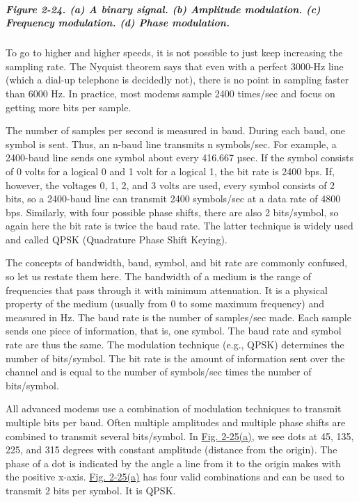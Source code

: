 \subparagraph[Figure 2-24. (a) A binary signal. (b) Amplitude
modulation. (c) Frequency modulation. (d) Phase
modulation.]{\texorpdfstring{\protect\hypertarget{0130661023_ch02lev1sec5.htmlux5cux23ch02fig24}{}{}Figure
2-24. (a) A binary signal. (b) Amplitude modulation. (c) Frequency
modulation. (d) Phase
modulation.}{Figure 2-24. (a) A binary signal. (b) Amplitude modulation. (c) Frequency modulation. (d) Phase modulation.}}


To go to higher and higher speeds, it is not possible to just keep
increasing the sampling rate. The Nyquist theorem says that even with a
perfect 3000-Hz line (which a dial-up telephone is decidedly not), there
is no point in sampling faster than 6000 Hz. In practice, most modems
sample 2400 times/sec and focus on getting more bits per sample.

The number of samples per second is measured in {baud}. During each
baud, one {symbol} is sent. Thus, an {n}-baud line transmits {n}
symbols/sec. For example, a 2400-baud line sends one symbol about every
416.667 µsec. If the symbol consists of 0 volts for a logical 0 and 1
volt for a logical 1, the bit rate is 2400 bps. If, however, the
voltages 0, 1, 2, and 3 volts are used, every symbol consists of 2 bits,
so a 2400-baud line can transmit 2400 symbols/sec at a data rate of 4800
bps. Similarly, with four possible phase shifts, there are also 2
bits/symbol, so again here the bit rate is twice the baud rate. The
latter technique is widely used and called {QPSK} ({Quadrature Phase
Shift Keying}).

The concepts of bandwidth, baud, symbol, and bit rate are commonly
confused, so let us restate them here. The bandwidth of a medium is the
range of frequencies that pass through it with minimum attenuation. It
is a physical property of the medium (usually from 0 to some maximum
frequency) and measured in Hz. The baud rate is the number of
samples/sec made. Each sample sends one piece of information, that is,
one symbol. The baud rate and symbol rate are thus the same. The
modulation technique (e.g., QPSK) determines the number of bits/symbol.
The bit rate is the amount of information sent over the channel and is
equal to the number of symbols/sec times the number of bits/symbol.

All advanced modems use a combination of modulation techniques to
transmit multiple bits per baud. Often multiple amplitudes and multiple
phase shifts are combined to transmit several bits/symbol. In
\protect\hyperlink{0130661023_ch02lev1sec5.htmlux5cux23ch02fig25}{Fig.
2-25(a)}, we see dots at 45, 135, 225, and 315 degrees with constant
amplitude (distance from the origin). The phase of a dot is indicated by
the angle a line from it to the origin makes with the positive x-axis.
\protect\hyperlink{0130661023_ch02lev1sec5.htmlux5cux23ch02fig25}{Fig.
2-25(a)} has four valid combinations and can be used to transmit 2 bits
per symbol. It is QPSK.

